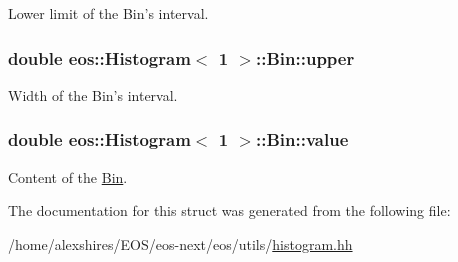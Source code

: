 Lower limit of the Bin's interval. \hypertarget{structeos_1_1Histogram_3_011_01_4_1_1Bin_ab83ca1387607899b43e21d21acb0e38d}{
\subsubsection[{upper}]{\setlength{\rightskip}{0pt plus 5cm}double eos::Histogram$<$ 1 $>$::Bin::upper}}
\label{structeos_1_1Histogram_3_011_01_4_1_1Bin_ab83ca1387607899b43e21d21acb0e38d}


Width of the Bin's interval. \hypertarget{structeos_1_1Histogram_3_011_01_4_1_1Bin_aed7930bf76124d4d4e3d347419890339}{
\subsubsection[{value}]{\setlength{\rightskip}{0pt plus 5cm}double eos::Histogram$<$ 1 $>$::Bin::value}}
\label{structeos_1_1Histogram_3_011_01_4_1_1Bin_aed7930bf76124d4d4e3d347419890339}


Content of the \hyperlink{structeos_1_1Histogram_3_011_01_4_1_1Bin}{Bin}. 

The documentation for this struct was generated from the following file:\begin{DoxyCompactItemize}
\item 
/home/alexshires/EOS/eos-\/next/eos/utils/\hyperlink{histogram_8hh}{histogram.hh}\end{DoxyCompactItemize}

